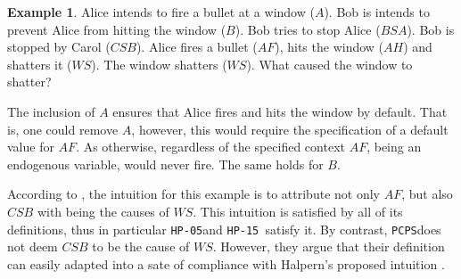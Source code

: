 \documentclass[11pt,a4paper]{book}
\theoremstyle{definition}
\theoremstyle{definition}
\newtheorem{example}{Example}[section]
\theoremstyle{definition}
\theoremstyle{remark}
\newcommand{\hpu}{\texttt{HP-05}}
\newcommand{\hpm}{\texttt{HP-15 }}
\newcommand{\pcps}{\texttt{PCPS}}
\begin{document}
\begin{example}
\label{ex:double-preemption-1}
Alice intends to fire a bullet at a window ($A$). 
Bob is intends to prevent Alice from hitting the window ($B$).
Bob tries to stop Alice ($BSA$).
Bob is stopped by Carol ($CSB$). 
Alice fires a bullet ($AF$), hits the window ($AH$) and shatters it ($WS$). 
The window shatters ($WS$). 
What caused the window to shatter?
\begin{center}
\end{center}
The inclusion of $A$ ensures that Alice fires and hits the window by default. That is, one could remove $A$, however, this would require the specification of a default value for $AF$.
As otherwise, regardless of the specified context $AF$, being an endogenous variable, would never fire. 
The same holds for $B$.
\end{example}

According to \parencite[p.~35]{halpern2016actual}, the intuition for this example is to attribute not only $AF$, but also $CSB$ with being the causes of $WS$. 
This intuition is satisfied by all of its definitions, thus in particular \hpu and \hpm satisfy it. By contrast, \pcps does not deem $CSB$ to be the cause of $WS$. 
However, they argue that their definition can easily adapted into a sate of compliance with Halpern's proposed intuition \parencite[p.~36]{denecker2019explaining,halpern2016actual}. 
\end{document}
